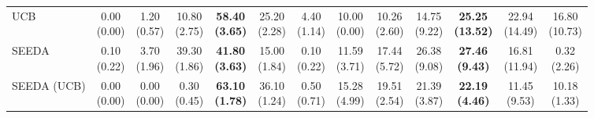 \begin{table}[H]
{\begin{tabular}{l|cccccc|cccccc}
UCB & \makecell{0.00 \\ (0.00)} & \makecell{1.20 \\ (0.57)} & {\cellcolor[HTML]{C8E6C9}} \makecell{10.80 \\ (2.75)} & \bfseries \makecell{58.40 \\ (3.65)} & \makecell{25.20 \\ (2.28)} & \makecell{4.40 \\ (1.14)} & \makecell{10.00 \\ (0.00)} & \makecell{10.26 \\ (2.60)} & {\cellcolor[HTML]{C8E6C9}} \makecell{14.75 \\ (9.22)} & \bfseries \makecell{25.25 \\ (13.52)} & \makecell{22.94 \\ (14.49)} & \makecell{16.80 \\ (10.73)} \\
SEEDA & \makecell{0.10 \\ (0.22)} & \makecell{3.70 \\ (1.96)} & {\cellcolor[HTML]{C8E6C9}} \makecell{39.30 \\ (1.86)} & \bfseries \makecell{41.80 \\ (3.63)} & \makecell{15.00 \\ (1.84)} & \makecell{0.10 \\ (0.22)} & \makecell{11.59 \\ (3.71)} & \makecell{17.44 \\ (5.72)} & {\cellcolor[HTML]{C8E6C9}} \makecell{26.38 \\ (9.08)} & \bfseries \makecell{27.46 \\ (9.43)} & \makecell{16.81 \\ (11.94)} & \makecell{0.32 \\ (2.26)} \\
SEEDA (UCB) & \makecell{0.00 \\ (0.00)} & \makecell{0.00 \\ (0.00)} & {\cellcolor[HTML]{C8E6C9}} \makecell{0.30 \\ (0.45)} & \bfseries \makecell{63.10 \\ (1.78)} & \makecell{36.10 \\ (1.24)} & \makecell{0.50 \\ (0.71)} & \makecell{15.28 \\ (4.99)} & \makecell{19.51 \\ (2.54)} & {\cellcolor[HTML]{C8E6C9}} \makecell{21.39 \\ (3.87)} & \bfseries \makecell{22.19 \\ (4.46)} & \makecell{11.45 \\ (9.53)} & \makecell{10.18 \\ (1.33)} \\

\end{tabular}}
\end{table}
